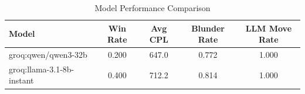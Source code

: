 \begin{table}[h]
\centering
\caption{Model Performance Comparison}
\begin{tabular}{lcccc}
\toprule
Model & Win Rate & Avg CPL & Blunder Rate & LLM Move Rate \\
\midrule
groq:qwen/qwen3-32b & 0.200 & 647.0 & 0.772 & 1.000 \\
groq:llama-3.1-8b-instant & 0.400 & 712.2 & 0.814 & 1.000 \\
\bottomrule
\end{tabular}
\end{table}